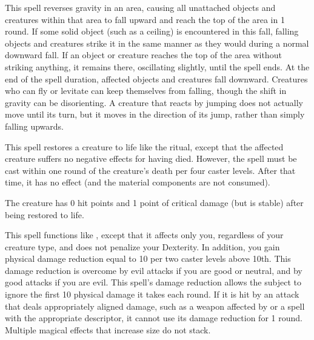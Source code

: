 \spelleffect This spell reverses gravity in an area, causing all unattached objects and creatures within that area to fall upward and reach the top of the area in 1 round. If some solid object (such as a ceiling) is encountered in this fall, falling objects and creatures strike it in the same manner as they would during a normal downward fall. If an object or creature reaches the top of the area without striking anything, it remains there, oscillating slightly, until the spell ends. At the end of the spell duration, affected objects and creatures fall downward.
\spellnotes Creatures who can fly or levitate can keep themselves from falling, though the shift in gravity can be disorienting. A creature that reacts by jumping does not actually move until its turn, but it moves in the direction of its jump, rather than simply falling upwards.

\spelleffect This spell restores a creature to life like the  ritual, except that the affected creature suffers no negative effects for having died. However, the spell must be cast within one round of the creature's death per four caster levels. After that time, it has no effect (and the material components are not consumed).

The creature has 0 hit points and 1 point of critical damage (but is stable) after being restored to life.

\spelleffect This spell functions like , except that it affects only you, regardless of your creature type, and does not penalize your Dexterity. In addition, you gain physical damage reduction equal to 10  per two caster levels above 10th. This damage reduction is overcome by evil attacks if you are good or neutral, and by good attacks if you are evil.
\spellnotes This spell's damage reduction allows the subject to ignore the first 10 physical damage it takes each round. If it is hit by an attack that deals appropriately aligned damage, such as a weapon affected by  or a spell with the appropriate descriptor, it cannot use its damage reduction for 1 round.
Multiple magical effects that increase size do not stack.


